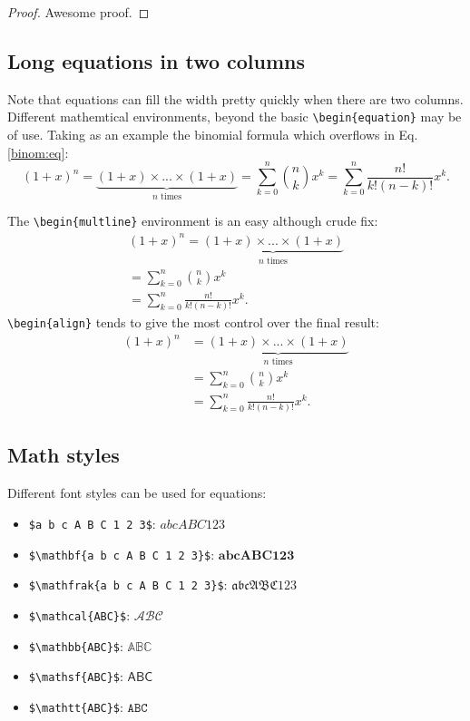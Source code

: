 \documentclass{melba}
\begin{document}
		\begin{proof}
			Awesome proof.
		\end{proof}

	\subsection{Long equations in two columns}
		Note that equations can fill the width pretty quickly when there are two columns.
		Different mathemtical environments, beyond the basic \verb|\begin{equation}| may be of use. Taking as an example the binomial formula which overflows in Eq. \eqref{binom:eq}:
		\begin{equation}
			\label{binom:eq}
			(1+x)^n = \underbrace{(1+x)\times...\times(1+x)}_{n \text{ times}} = \sum_{k=0}^n \binom{n}{k}x^k = \sum_{k=0}^n\frac{n!}{k!(n-k)!}x^k .
	        \end{equation}

	        The \verb|\begin{multline}| environment is an easy although crude fix:
	        \begin{multline}
			(1+x)^n = \underbrace{(1+x)\times...\times(1+x)}_{n \text{ times}} \\
			= \sum_{k=0}^n \binom{n}{k}x^k \\
			= \sum_{k=0}^n\frac{n!}{k!(n-k)!}x^k .
	        \end{multline}
	        \verb|\begin{align}| tends to give the most control over the final result:
	        \begin{align}
			(1+x)^n &= \underbrace{(1+x)\times...\times(1+x)}_{n \text{ times}} \nonumber\\
			        &= \sum_{k=0}^n \binom{n}{k}x^k \nonumber\\
			        &= \sum_{k=0}^n\frac{n!}{k!(n-k)!}x^k .
	        \end{align}


	\subsection{Math styles}
		Different font styles can be used for equations:
		\begin{itemize}
			\item \verb|$a b c A B C 1 2 3$|: $ a b c A B C 1 2 3 $
			\item \verb|$\mathbf{a b c A B C 1 2 3}$|: $ \mathbf{a b c A B C 1 2 3} $
			\item \verb|$\mathfrak{a b c A B C 1 2 3}$|: $ \mathfrak{a b c A B C 1 2 3} $
			\item \verb|$\mathcal{ABC}$|: $ \mathcal{ABC} $
			\item \verb|$\mathbb{ABC}$|: $ \mathbb{ABC} $
			\item \verb|$\mathsf{ABC}$|: $ \mathsf{ABC} $
			\item \verb|$\mathtt{ABC}$|: $ \mathtt{ABC} $
		\end{itemize}
\end{document}
